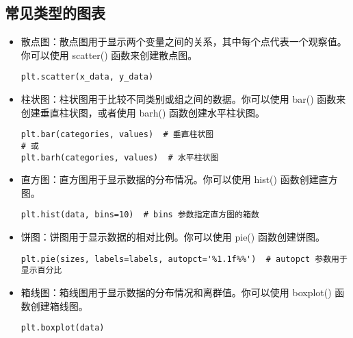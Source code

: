 \documentclass{article}
\begin{document}
\subsection{常见类型的图表}
\begin{itemize}
    

    \item 散点图：散点图用于显示两个变量之间的关系，其中每个点代表一个观察值。你可以使用 scatter() 函数来创建散点图。
\begin{lstlisting}[caption={示例Python代码}]
plt.scatter(x_data, y_data)
\end{lstlisting}
\item 柱状图：柱状图用于比较不同类别或组之间的数据。你可以使用 bar() 函数来创建垂直柱状图，或者使用 barh() 函数创建水平柱状图。
\begin{lstlisting}[caption={示例Python代码}]
plt.bar(categories, values)  # 垂直柱状图
# 或
plt.barh(categories, values)  # 水平柱状图
\end{lstlisting}
\item 直方图：直方图用于显示数据的分布情况。你可以使用 hist() 函数创建直方图。
\begin{lstlisting}[caption={示例Python代码}]
plt.hist(data, bins=10)  # bins 参数指定直方图的箱数
\end{lstlisting}
\item 饼图：饼图用于显示数据的相对比例。你可以使用 pie() 函数创建饼图。
\begin{lstlisting}[caption={示例Python代码}]
plt.pie(sizes, labels=labels, autopct='%1.1f%%')  # autopct 参数用于显示百分比
\end{lstlisting}
\item 箱线图：箱线图用于显示数据的分布情况和离群值。你可以使用 boxplot() 函数创建箱线图。
\begin{lstlisting}[caption={示例Python代码}]
plt.boxplot(data)
\end{lstlisting}
\end{itemize}
\end{document}
